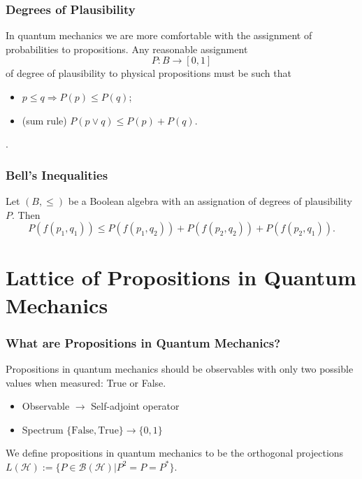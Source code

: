 \documentclass{beamer}
\begin{document}
\begin{frame}

	\frametitle{Degrees of Plausibility}
	
	In quantum mechanics we are more comfortable with the assignment of probabilities to propositions\cite{Jaynes2003}. Any reasonable assignment 
	\begin{equation}
		P:B\rightarrow [0,1]
	\end{equation}
	of degree of plausibility to physical propositions must be such that 
	\begin{itemize}
		\item $p\leq q\Rightarrow P(p)\leq P(q)$;
		\item (sum rule) $P(p\vee q)\leq P(p)+P(q)$.
	\end{itemize}.
	
\end{frame}

\begin{frame}

	\frametitle{Bell's Inequalities}

	\begin{theorem}
	
		Let $(B,\leq)$ be a Boolean algebra with an assignation of degrees of plausibility $P$. Then
		\begin{equation}
			P(f(p_1,q_1))\leq P(f(p_1,q_2))+P(f(p_2,q_2))+P(f(p_2,q_1)).
		\end{equation}			
	
	\end{theorem}

\end{frame}

\section{Lattice of Propositions in Quantum Mechanics}

\begin{frame}

	\frametitle{What are Propositions in Quantum Mechanics?}
	
	Propositions in quantum mechanics should be observables with only two possible values when measured: True or False\cite{Wilce2012}.
	
	\begin{itemize}
	
		\item Observable $\rightarrow$ Self-adjoint operator
		
		\item Spectrum $\{\text{False},\text{True}\}\rightarrow\{0,1\}$	
	
	\end{itemize}
	
	\begin{definition}
	
		We define propositions in quantum mechanics to be the orthogonal projections $L(\mathcal{H}):=\{P\in\mathcal{B}(\mathcal{H})|P^2=P=P^*\}$.	
	
	\end{definition}

\end{frame}
	
\end{document}
